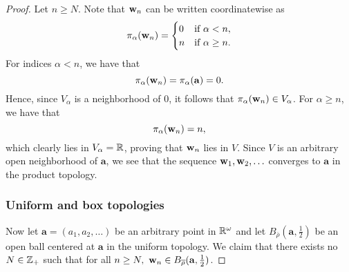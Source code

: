 \begin{solution}
\begin{proof}
        Let $n \geq N$.
        Note that $\mathbf{w}_n$ can be written coordinatewise as
        \begin{equation*}
            \pi_\alpha(\mathbf{w}_n) = \begin{cases}
                0   & \text{if } \alpha < n, \\
                n   & \text{if } \alpha \geq n.
            \end{cases}
        \end{equation*}
        For indices $\alpha < n$, we have that
        \begin{equation*}
            \pi_\alpha(\mathbf{w}_n) = \pi_\alpha(\mathbf{a}) = 0.
        \end{equation*}
        Hence, since $V_\alpha$ is a neighborhood of $0$, it follows that $\pi_\alpha(\mathbf{w}_n) \in V_\alpha$.
        For $\alpha \geq n$, we have that
        \begin{equation*}
            \pi_\alpha(\mathbf{w}_n) = n,
        \end{equation*}
        which clearly lies in $V_\alpha = \mathbb{R}$, proving that $\mathbf{w}_n$ lies in $V$.
        Since $V$ is an arbitrary open neighborhood of $\mathbf{a}$, we see that the sequence $\mathbf{w}_1, \mathbf{w}_2, \ldots$ converges to $\mathbf{a}$ in the product topology.

        \subsubsection*{Uniform and box topologies}
        Now let $\mathbf{a} = (a_1, a_2, \ldots)$ be an arbitrary point in $\mathbb{R}^\omega$ and let $B_{\overline{\rho}}(\mathbf{a}, \tfrac{1}{2})$ be an open ball centered at $\mathbf{a}$ in the uniform topology.
        We claim that there exists no $N \in \mathbb{Z}_+$ such that for all $n \geq N,~ \mathbf{w}_n \in B_{\overline{\rho}}(\mathbf{a}, \tfrac{1}{2})$.


\end{proof}
\end{solution}
